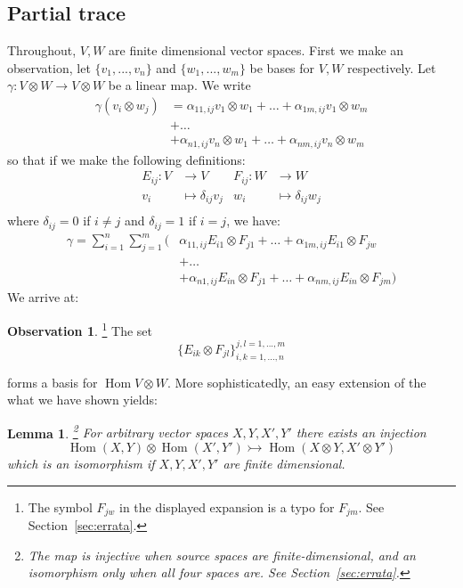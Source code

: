 \documentclass[12pt]{article}
\theoremstyle{plain}
\newtheorem{lemma}[thm]{Lemma}
\theoremstyle{definition}
\newtheorem{observation}[thm]{Observation}
\newcommand{\lto}{\longrightarrow}
\begin{document}
\subsection{Partial trace}
Throughout, $V,W$ are finite dimensional vector spaces. First we make an observation, let $\lbrace v_1,...,v_n
\rbrace$ and $\lbrace w_1,...,w_m\rbrace$ be bases for $V,W$ respectively. Let $\gamma: V \otimes W \lto V \otimes W$ be a linear map. We write
\begin{align*}
\gamma(v_i \otimes w_j) &= \alpha_{11,ij}v_1 \otimes w_1 + \hdots + \alpha_{1m,ij}v_1 \otimes w_m\\
&+ \hdots\\
&+ \alpha_{n1,ij}v_n \otimes w_1 + \hdots + \alpha_{nm,ij}v_n \otimes w_m
\end{align*}
so that if we make the following definitions:
\begin{align*}
E_{ij}: V &\lto V & F_{ij}: W &\lto W\\
v_i &\longmapsto \delta_{ij}v_j & w_i &\longmapsto \delta_{ij}w_j\\
\end{align*}
where $\delta_{ij} = 0$ if $i \neq j$ and $\delta_{ij} = 1$ if $i = j$, we have:
\begin{align*}
\gamma = \sum_{i = 1}^n\sum_{j = 1}^m\Big(&\alpha_{11,ij}E_{i1}\otimes F_{j1} + \hdots + \alpha_{1m,ij}E_{i1} \otimes F_{jw}\\
&+ \hdots\\
&+ \alpha_{n1,ij}E_{in} \otimes F_{j1} + \hdots + \alpha_{nm,ij}E_{in} \otimes F_{jm}\Big)
\end{align*}
We arrive at: 
\begin{observation}\label{obs:basis}\footnote{The symbol $F_{jw}$ in the displayed expansion is a typo for $F_{jm}$. See Section~\ref{sec:errata}.}
The set
\begin{equation}
\lbrace E_{ik} \otimes F_{jl}\rbrace_{i,k = 1,...,n}^{j,l =1,...,m}
\end{equation}
\end{observation}
forms a basis for $\operatorname{Hom}V \otimes W$. More sophisticatedly, an easy extension of the what we have shown yields:
\begin{lemma}\label{lem:embedding_tensor}\footnote{The map is injective when source spaces are finite-dimensional, and an isomorphism only when all four spaces are. See Section~\ref{sec:errata}.}
For arbitrary vector spaces $X,Y,X',Y'$ there exists an injection
\begin{equation}
\operatorname{Hom}(X,Y) \otimes \operatorname{Hom}(X',Y') \rightarrowtail \operatorname{Hom}(X \otimes Y, X'\otimes Y')
\end{equation}
which is an isomorphism if $X,Y,X',Y'$ are finite dimensional.
\end{lemma}
\end{document}
